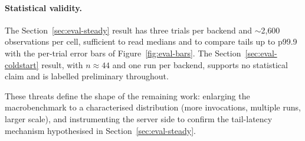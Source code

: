 \paragraph{Statistical validity.}
The Section~\ref{sec:eval-steady} result has three trials per backend and $\sim$2{,}600 observations per cell, sufficient to read medians and to compare tails up to p99.9 with the per-trial error bars of Figure~\ref{fig:eval-bars}. The Section~\ref{sec:eval-coldstart} result, with $n \approx 44$ and one run per backend, supports no statistical claim and is labelled preliminary throughout.

These threats define the shape of the remaining work: enlarging the macrobenchmark to a characterised distribution (more invocations, multiple runs, larger scale), and instrumenting the server side to confirm the tail-latency mechanism hypothesised in Section~\ref{sec:eval-steady}.
